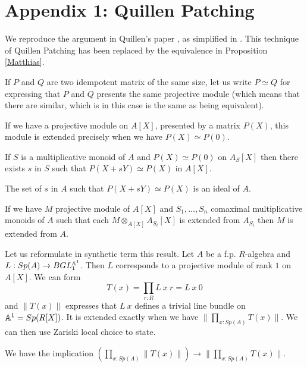 \section*{Appendix 1: Quillen Patching}

We reproduce the argument in Quillen's paper \cite{Quillen}, as simplified in \cite{lombardi-quitte}.
This technique of Quillen Patching has been replaced by the equivalence in Proposition \ref{Matthias}.

If $P$ and $Q$ are two idempotent matrix of the same size, let us write $P\simeq Q$ for expressing that $P$ and $Q$ presents
the same projective module (which means that there are similar, which is in this case is the same as being equivalent).

If we have a projective module on $A[X]$, presented by a matrix $P(X)$, this module is extended
precisely when we have $P(X)\simeq P(0)$.

\begin{lemma}
  If $S$ is a multiplicative monoid of $A$ and $P(X)\simeq P(0)$ on $A_S[X]$ then there exists
  $s$ in $S$ such that $P(X+sY)\simeq P(X)$ in $A[X]$.
\end{lemma}

\begin{lemma}
  The set of $s$ in $A$ such that $P(X+sY)\simeq P(X)$ is an ideal of $A$.
\end{lemma}

\begin{corollary}
  If we have $M$ projective module of $A[X]$ and $S_1,\dots,S_n$ comaximal multiplicative monoids of $A$
  such that each $M\otimes_{A[X]} A_{S_i}[X]$ is extended from $A_{S_i}$ then $M$ is extended from $A$.
\end{corollary}

Let us reformulate in synthetic term this result. Let $A$ be a f.p. $R$-algebra and $L:Sp(A)\rightarrow BGL_1^{\mathbb{A}^1}$.
Then $L$ corresponds to a projective module of rank $1$ on $A[X]$. We can form
$$T(x) = \prod_{r:R}L~x~r = L~x~0$$
and $\|T(x)\|$ expresses that $L~x$ defines a trivial line bundle on $\mathbb{A}^1 = Sp(R[X])$.
It is extended exactly when we have
$\|{\prod_{x:Sp(A)}T(x)}\|$. We can then use Zariski local choice to state.

\begin{proposition}\label{c2}
  We have the implication $(\prod_{x:Sp(A)}\|T(x)\|)\rightarrow \|\prod_{x:Sp(A)}T(x)\|$.
\end{proposition}

\newpage

